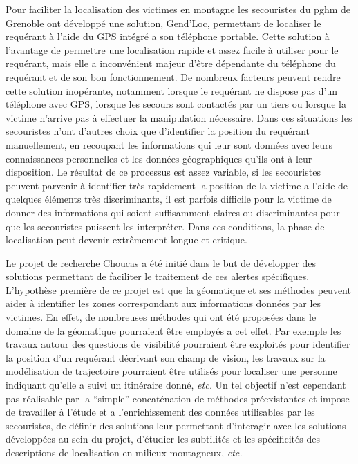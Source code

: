 Pour faciliter la localisation des victimes en montagne les
secouristes du \ac{pghm} de Grenoble ont développé une solution,
Gend'Loc, permettant de localiser le requérant à l'aide du GPS intégré
a son téléphone portable. Cette solution à l'avantage de permettre une
localisation rapide et assez facile à utiliser pour le requérant, mais
elle a inconvénient majeur d'être dépendante du téléphone du requérant
et de son bon fonctionnement. De nombreux facteurs peuvent rendre
cette solution inopérante, notamment lorsque le requérant ne dispose
pas d'un téléphone avec GPS, lorsque les secours sont contactés par un
tiers ou lorsque la victime n'arrive pas à effectuer la manipulation
nécessaire. Dans ces situations les secouristes n'ont d'autres choix
que d'identifier la position du requérant manuellement, en recoupant
les informations qui leur sont données avec leurs connaissances
personnelles et les données géographiques qu'ils ont à leur
disposition. Le résultat de ce processus est assez variable, si les
secouristes peuvent parvenir à identifier très rapidement la position
de la victime a l'aide de quelques éléments très discriminants, il est
parfois difficile pour la victime de donner des informations qui
soient suffisamment claires ou discriminantes pour que les secouristes
puissent les interpréter. Dans ces conditions, la phase de
localisation peut devenir extrêmement longue et critique.

Le projet de recherche Choucas a été initié dans le but de développer
des solutions permettant de faciliter le traitement de ces alertes
spécifiques. L'hypothèse première de ce projet est que la géomatique
et ses méthodes peuvent aider à identifier les zones correspondant aux
informations données par les victimes. En effet, de nombreuses
méthodes qui ont été proposées dans le domaine de la géomatique
pourraient être employés a cet effet. Par exemple les travaux autour
des questions de visibilité pourraient être exploités pour identifier
la position d'un requérant décrivant son champ de vision, les travaux
sur la modélisation de trajectoire pourraient être utilisés pour
localiser une personne indiquant qu'elle a suivi un itinéraire donné,
\emph{etc.} Un tel objectif n'est cependant pas réalisable par la
\enquote{simple} concaténation de méthodes préexistantes et impose de
travailler à l'étude et a l’enrichissement des données utilisables par
les secouristes, de définir des solutions leur permettant d’interagir
avec les solutions développées au sein du projet, d'étudier les
subtilités et les spécificités des descriptions de localisation en
milieux montagneux, \emph{etc.}

